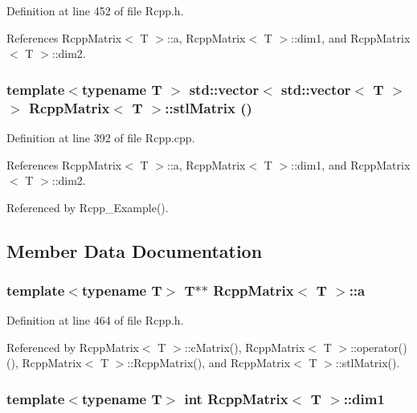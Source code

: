 Definition at line 452 of file Rcpp.h.

References RcppMatrix$<$ T $>$::a, RcppMatrix$<$ T $>$::dim1, and RcppMatrix$<$ T $>$::dim2.\hypertarget{classRcppMatrix_e74547edb5d989adb87b2e483153de89}{
\subsubsection[{stlMatrix}]{\setlength{\rightskip}{0pt plus 5cm}template$<$typename T $>$ std::vector$<$ std::vector$<$ T $>$ $>$ {\bf RcppMatrix}$<$ T $>$::stlMatrix ()}}
\label{classRcppMatrix_e74547edb5d989adb87b2e483153de89}




Definition at line 392 of file Rcpp.cpp.

References RcppMatrix$<$ T $>$::a, RcppMatrix$<$ T $>$::dim1, and RcppMatrix$<$ T $>$::dim2.

Referenced by Rcpp\_\-Example().

\subsection{Member Data Documentation}
\hypertarget{classRcppMatrix_3f4dad8e2aed525c9b20e98d262ec31e}{
\subsubsection[{a}]{\setlength{\rightskip}{0pt plus 5cm}template$<$typename T$>$ T$\ast$$\ast$ {\bf RcppMatrix}$<$ T $>$::{\bf a}}}
\label{classRcppMatrix_3f4dad8e2aed525c9b20e98d262ec31e}




Definition at line 464 of file Rcpp.h.

Referenced by RcppMatrix$<$ T $>$::cMatrix(), RcppMatrix$<$ T $>$::operator()(), RcppMatrix$<$ T $>$::RcppMatrix(), and RcppMatrix$<$ T $>$::stlMatrix().\hypertarget{classRcppMatrix_3b2f3ef7c2b482e4f7e7f4f96b787128}{
\subsubsection[{dim1}]{\setlength{\rightskip}{0pt plus 5cm}template$<$typename T$>$ int {\bf RcppMatrix}$<$ T $>$::{\bf dim1}}}
\label{classRcppMatrix_3b2f3ef7c2b482e4f7e7f4f96b787128}




